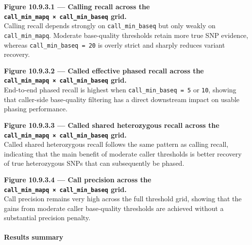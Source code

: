 \documentclass[
]{article}
\begin{document}
\textbf{Figure 10.9.3.1 --- Calling recall across the
\texttt{call\_min\_mapq\ ×\ call\_min\_baseq} grid.}\\
Calling recall depends strongly on \texttt{call\_min\_baseq} but only
weakly on \texttt{call\_min\_mapq}. Moderate base-quality thresholds
retain more true SNP evidence, whereas \texttt{call\_min\_baseq\ =\ 20}
is overly strict and sharply reduces variant recovery.

\textbf{Figure 10.9.3.2 --- Called effective phased recall across the
\texttt{call\_min\_mapq\ ×\ call\_min\_baseq} grid.}\\
End-to-end phased recall is highest when \texttt{call\_min\_baseq\ =\ 5}
or \texttt{10}, showing that caller-side base-quality filtering has a
direct downstream impact on usable phasing performance.

\textbf{Figure 10.9.3.3 --- Called shared heterozygous recall across the
\texttt{call\_min\_mapq\ ×\ call\_min\_baseq} grid.}\\
Called shared heterozygous recall follows the same pattern as calling
recall, indicating that the main benefit of moderate caller thresholds
is better recovery of true heterozygous SNPs that can subsequently be
phased.

\textbf{Figure 10.9.3.4 --- Call precision across the
\texttt{call\_min\_mapq\ ×\ call\_min\_baseq} grid.}\\
Call precision remains very high across the full threshold grid, showing
that the gains from moderate caller base-quality thresholds are achieved
without a substantial precision penalty.

\paragraph{Results summary}\label{results-summary-2}
\end{document}
